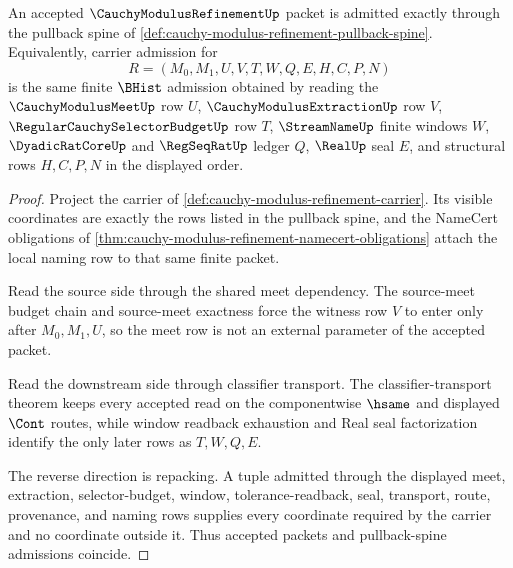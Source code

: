 \begin{theorem}
\label{thm:cauchy-modulus-refinement-pullback-spine-admission}
An accepted $\CauchyModulusRefinementUp$ packet is admitted exactly through the pullback spine of \autoref{def:cauchy-modulus-refinement-pullback-spine}. Equivalently, carrier admission for
$$
R=(M_0,M_1,U,V,T,W,Q,E,H,C,P,N)
$$
is the same finite $\BHist$ admission obtained by reading the $\CauchyModulusMeetUp$ row $U$, $\CauchyModulusExtractionUp$ row $V$, $\RegularCauchySelectorBudgetUp$ row $T$, $\StreamNameUp$ finite windows $W$, $\DyadicRatCoreUp$ and $\RegSeqRatUp$ ledger $Q$, $\RealUp$ seal $E$, and structural rows $H,C,P,N$ in the displayed order.
\end{theorem}
\begin{proof}
Project the carrier of \autoref{def:cauchy-modulus-refinement-carrier}. Its visible coordinates are exactly the rows listed in the pullback spine, and the NameCert obligations of \autoref{thm:cauchy-modulus-refinement-namecert-obligations} attach the local naming row to that same finite packet.

Read the source side through the shared meet dependency. The source-meet budget chain and source-meet exactness force the witness row $V$ to enter only after $M_0,M_1,U$, so the meet row is not an external parameter of the accepted packet.

Read the downstream side through classifier transport. The classifier-transport theorem keeps every accepted read on the componentwise $\hsame$ and displayed $\Cont$ routes, while window readback exhaustion and Real seal factorization identify the only later rows as $T,W,Q,E$.

The reverse direction is repacking. A tuple admitted through the displayed meet, extraction, selector-budget, window, tolerance-readback, seal, transport, route, provenance, and naming rows supplies every coordinate required by the carrier and no coordinate outside it. Thus accepted packets and pullback-spine admissions coincide.
\end{proof}


